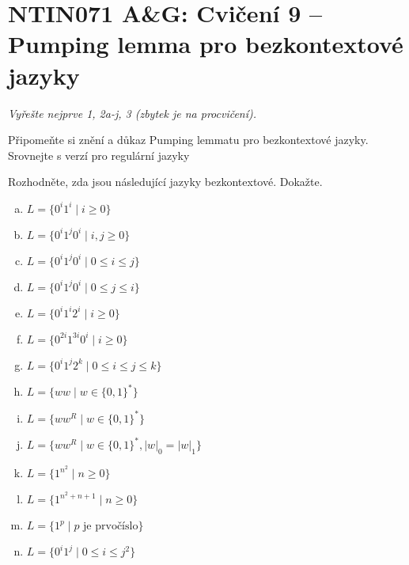 \documentclass[a4paper,12pt]{amsart}
\begin{document}
\thispagestyle{empty}

\section*{NTIN071 A\&G: Cvičení 9 -- Pumping lemma pro bezkontextové jazyky}


\medskip

\noindent\emph{Vyřešte nejprve 1, 2a-j, 3 (zbytek je na procvičení).}

\medskip


\medskip\begin{problem}

    Připomeňte si znění a důkaz Pumping lemmatu pro bezkontextové jazyky. Srovnejte s verzí pro regulární jazyky

\end{problem}


\medskip\begin{problem}

    Rozhodněte, zda jsou následující jazyky bezkontextové. Dokažte.
    
    \begin{multicols}{2}
    
        \begin{enumerate}[(a)]
            \setlength\itemsep{1em}
            \item $L=\{0^i1^i\mid i\geq 0\}$
            \item $L=\{0^i1^j0^i\mid i,j\geq 0\}$
            \item $L=\{0^i1^j0^i\mid 0\leq i\leq j\}$
            \item $L=\{0^i1^j0^i\mid 0\leq j\leq i\}$
            \item $L=\{0^i1^i2^i\mid i\geq 0\}$
            \item $L=\{0^{2i}1^{3i}0^i\mid i\geq 0\}$
            \item $L=\{0^i1^j2^k\mid 0\leq i\leq j\leq k\}$
            \item $L=\{ww\mid w\in \{0,1\}^*\}$
            \item $L=\{ww^R\mid w\in \{0,1\}^*\}$
            \item $L=\{ww^R\mid w\in \{0,1\}^*, |w|_0=|w|_1\}$
            \item $L=\{1^{n^2}\mid n\geq 0\}$
            \item $L=\{1^{n^2+n+1}\mid n\geq 0\}$
            \item $L=\{1^p\mid p \text{ je prvočíslo}\}$
            \item $L=\{0^i1^{j}\mid 0\leq i\leq j^2\}$
        \end{enumerate}
    
    \end{multicols}

\end{problem}
\end{document}
